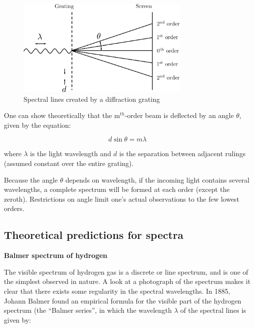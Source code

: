 \begin{figure}
\begin{centering}
\includegraphics[width=0.75\textwidth]{../images/grating-schematic.png} 
\caption{Spectral lines created by a diffraction grating}
\label{fig:grating}
\end{centering}
\end{figure}

One can show theoretically that the m$^{th}$-order beam is deflected by an angle
${\theta}$, given by the equation:

\begin{equation}
d \sin \theta = m \lambda
\label{eq:gratingmaxima}
\end{equation}

\noindent where ${\lambda}$ is the light wavelength and $d$ is the separation
between adjacent rulings (assumed constant over the entire grating).

Because the angle ${\theta}$ depends on wavelength, if the incoming light
contains several wavelengths, a complete spectrum will be formed at
each order (except the zeroth). Restrictions on angle limit
one's actual observations to the few lowest orders.

\subsection{Theoretical predictions for spectra}

\noindent\textbf{Balmer spectrum of hydrogen}
\medskip

The visible spectrum of hydrogen gas is a discrete or line spectrum, and
is one of the simplest observed in nature. A look at a photograph of
the spectrum makes it clear that there exists some regularity in the
spectral wavelengths. In 1885, Johann Balmer found an empirical formula
for the visible part of the hydrogen spectrum (the
``Balmer series'', in which the wavelength
${\lambda}$ of the spectral lines is given by:

